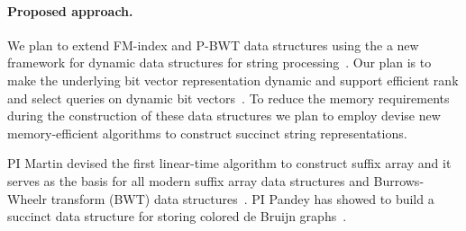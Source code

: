 \paragraph{Proposed approach.}

We plan to extend FM-index and P-BWT data structures using the a new framework for dynamic data structures for string processing~\cite{Nicola17,Farzan2011}. Our plan is to make the underlying bit vector representation dynamic and support efficient rank and select queries on dynamic bit vectors~\cite{Raman2001}.
To reduce the memory requirements during the construction of these data structures we plan to employ devise new memory-efficient algorithms to construct succinct string representations.


PI Martin devised the first linear-time algorithm to construct suffix array and it serves as the basis for all modern suffix array data structures and Burrows-Wheelr transform (BWT) data structures~\cite{Farach97,Ambainis97}.
PI Pandey has showed to build a succinct data structure for storing colored de Bruijn graphs~\cite{almodaresi2017rainbowfish}. 
